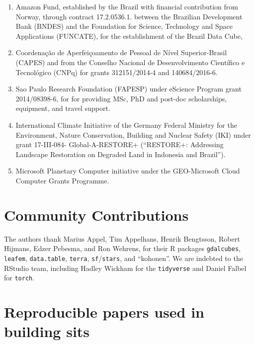 \documentclass[
  11pt,
]{report}
\newcommand{\passthrough}[1]{#1}
\begin{document}
\begin{enumerate}
\def\labelenumi{\arabic{enumi}.}
\item
  Amazon Fund, established by the Brazil with financial contribution
  from Norway, through contract 17.2.0536.1. between the Brazilian
  Development Bank (BNDES) and the Foundation for Science, Technology
  and Space Applications (FUNCATE), for the establishment of the Brazil
  Data Cube,
\item
  Coordenação de Aperfeiçoamento de Pessoal de Nível Superior-Brasil
  (CAPES) and from the Conselho Nacional de Desenvolvimento Científico e
  Tecnológico (CNPq) for grants 312151/2014-4 and 140684/2016-6.
\item
  Sao Paulo Research Foundation (FAPESP) under eScience Program grant
  2014/08398-6, for for providing MSc, PhD and post-doc scholarships,
  equipment, and travel support.
\item
  International Climate Initiative of the Germany Federal Ministry for
  the Environment, Nature Conservation, Building and Nuclear Safety
  (IKI) under grant 17-III-084- Global-A-RESTORE+ (``RESTORE+:
  Addressing Landscape Restoration on Degraded Land in Indonesia and
  Brazil'').
\item
  Microsoft Planetary Computer initiative under the GEO-Microsoft Cloud
  Computer Grants Programme.
\end{enumerate}

\hypertarget{community-contributions}{%
\section*{Community Contributions}\label{community-contributions}}

The authors thank Marius Appel, Tim Appelhans, Henrik Bengtsson, Robert
Hijmans, Edzer Pebesma, and Ron Wehrens, for their R packages
\passthrough{\lstinline!gdalcubes!}, \passthrough{\lstinline!leafem!},
\passthrough{\lstinline!data.table!}, \passthrough{\lstinline!terra!},
\passthrough{\lstinline!sf!}/\passthrough{\lstinline!stars!}, and
``kohonen''. We are indebted to the RStudio team, including Hadley
Wickham for the \passthrough{\lstinline!tidyverse!} and Daniel Falbel
for \passthrough{\lstinline!torch!}.

\hypertarget{reproducible-papers-used-in-building-sits}{%
\section*{Reproducible papers used in building
sits}\label{reproducible-papers-used-in-building-sits}}
\end{document}
